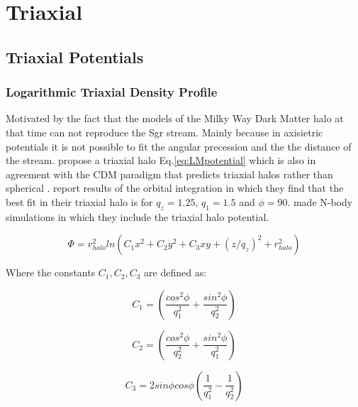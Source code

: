 \chapter{Triaxial}
\label{sec:Triaxial}
\section{Triaxial Potentials}


\subsection{Logarithmic Triaxial Density Profile}\label{sec:LM10}

Motivated by the fact that the models of the Milky Way Dark Matter halo
at that time can not reproduce the Sgr stream. Mainly because in axisietric
potentials it is not possible to fit the angular precession and the the
distance of the stream. \cite{Law09} propose a triaxial halo Eq.\ref{eq:LMpotential}
which is also in agreement with the CDM paradigm that predicts triaxial halos
rather than  spherical \cite{Lee03}. \cite{Law09} report results of the orbital
integration in which they find that the best fit in their triaxial halo is for $q_z = 1.25$,
 $q_1 = 1.5$ and $\phi=90$. \cite{Law10} made N-body simulations in which they
include the triaxial halo potential.

\begin{equation}\label{eq:LMpotential}
\Phi = v^2_{halo} ln(C_1 x^2 + C_2y^2 + C_3 xy + (z/q_z)^2+ r_{halo}^2)
\end{equation}

Where the constants $C_1, C_2, C_3$ are defined as:

\begin{equation}
C_1 = \left( \dfrac{cos^2 \phi}{q_1^2} + \dfrac{sin^2 \phi}{q_2^2}   \right)
\end{equation}

\begin{equation}
C_2 = \left( \dfrac{cos^2 \phi}{q_2^2} + \dfrac{sin^2 \phi}{q_1^2} \right)
\end{equation}

\begin{equation}
C_3 = 2 sin \phi cos\phi \left( \dfrac{1}{q_1^2} - \dfrac{1}{q_2^2} \right)
\end{equation}

